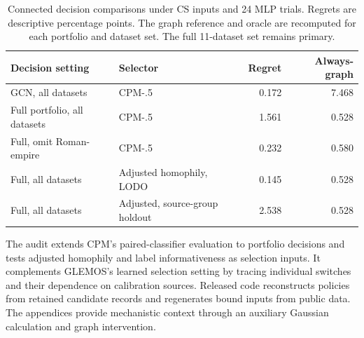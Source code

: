 \begin{table}[tbp]
\centering
\caption{Connected decision comparisons under CS inputs and 24 MLP trials. Regrets are descriptive percentage points. The graph reference and oracle are recomputed for each portfolio and dataset set. The full 11-dataset set remains primary.}
\label{tab:contribution_map}
\small
\setlength{\tabcolsep}{3pt}
\begin{tabular}{@{}llrr@{}}
\toprule
Decision setting & Selector & Regret & Always-graph \\
\midrule
GCN, all datasets & CPM-.5 & 0.172 & 7.468 \\
Full portfolio, all datasets & CPM-.5 & 1.561 & 0.528 \\
Full, omit Roman-empire & CPM-.5 & 0.232 & 0.580 \\
Full, all datasets & Adjusted homophily, LODO & 0.145 & 0.528 \\
Full, all datasets & Adjusted, source-group holdout & 2.538 & 0.528 \\
\bottomrule
\end{tabular}
\end{table}

The audit extends CPM's paired-classifier evaluation to portfolio decisions and tests adjusted homophily and label informativeness as selection inputs. It complements GLEMOS's learned selection setting by tracing individual switches and their dependence on calibration sources. Released code reconstructs policies from retained candidate records and regenerates bound inputs from public data. The appendices provide mechanistic context through an auxiliary Gaussian calculation and graph intervention.
